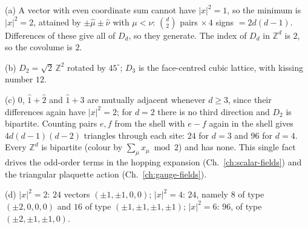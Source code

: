 {(a) A vector with even coordinate sum cannot have $|x|^2=1$, so the minimum is
$|x|^2=2$, attained by $\pm\hat\mu\pm\hat\nu$ with $\mu<\nu$: $\binom{d}{2}$
pairs $\times\,4$ signs $=2d(d-1)$. Differences of these give all of $D_d$, so
they generate. The index of $D_d$ in $\mathbb{Z}^d$ is $2$, so the covolume
is $2$.

(b) $D_2=\sqrt2\,\mathbb{Z}^2$ rotated by $45^\circ$; $D_3$ is the
face-centred cubic lattice, with kissing number $12$.

(c) $0$, $\hat1+\hat2$ and $\hat1+\hat3$ are mutually adjacent whenever $d\ge3$,
since their differences again have $|x|^2=2$; for $d=2$ there is no third
direction and $D_2$ is bipartite. Counting pairs $e,f$ from the shell with
$e-f$ again in the shell gives $4d(d-1)(d-2)$ triangles through each site:
$24$ for $d=3$ and $96$ for $d=4$. Every $\mathbb{Z}^d$ is bipartite (colour by
$\sum_\mu x_\mu \bmod 2$) and has none. This single fact drives the odd-order
terms in the hopping expansion (Ch.~\ref{ch:scalar-fields}) and the triangular
plaquette action (Ch.~\ref{ch:gauge-fields}).

(d) $|x|^2=2$: $24$ vectors $(\pm1,\pm1,0,0)$; $|x|^2=4$: $24$, namely $8$ of
type $(\pm2,0,0,0)$ and $16$ of type $(\pm1,\pm1,\pm1,\pm1)$; $|x|^2=6$: $96$,
of type $(\pm2,\pm1,\pm1,0)$.}

